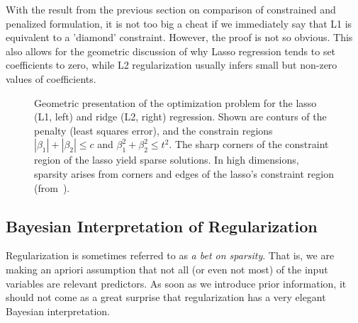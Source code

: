 \begin{refsection}
With the result from the previous section on comparison of constrained and penalized formulation, it is not too big a cheat if we immediately say that L1 is equivalent to a 'diamond' constraint. However, the proof is not so obvious. This also allows for the geometric discussion of why Lasso regression tends to set coefficients to zero, while L2 regularization usually infers small but non-zero values of coefficients.

\begin{figure}
\caption{Geometric presentation of the optimization problem for the lasso (L1, left) and ridge (L2, right) regression. Shown are conturs of the penalty (least squares error), and the constrain regions $|\beta_1|+|\beta_2|\leq c$ and $\beta_1^2+\beta_2^2\leq t^2$. The sharp corners of the constraint region of the lasso yield sparse solutions. In high dimensions, sparsity arises from corners and edges of the lasso's constraint region (from~\cite{Tibshirani2014}).}
\end{figure}


\subsection*{Bayesian Interpretation of Regularization}

Regularization is sometimes referred to as \emph{a bet on sparsity}. That is, we are making an apriori assumption that not all (or even not most) of the input variables are relevant predictors. As soon as we introduce prior information, it should not come as a great surprise that regularization has a very elegant Bayesian interpretation.


\end{refsection}
